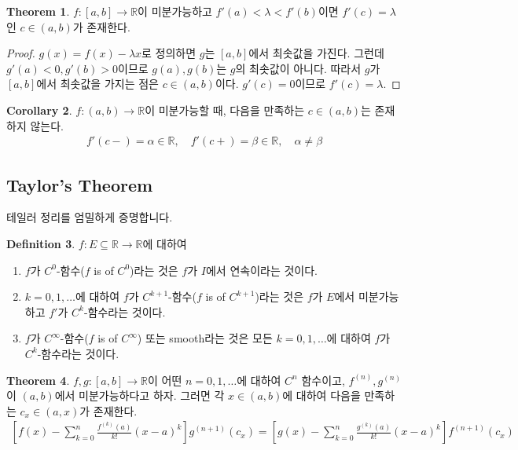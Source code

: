 \documentclass[12pt]{article}
\theoremstyle{definition}
\newtheorem{thm}{Theorem}[section]
\newtheorem{cor}[thm]{Corollary}
\newtheorem{defn}[thm]{Definition}
\def\RR{\mathbb{R}}
\begin{document}
\begin{thm}
	\(f: [a, b] \rightarrow \RR\)이 미분가능하고 \(f'(a) < \lambda < f'(b)\)이면 \(f'(c) = \lambda\)인 \(c \in (a, b)\)가 존재한다.
\end{thm}
\begin{proof}
	\(g(x) = f(x) - \lambda x\)로 정의하면 \(g\)는 \([a, b]\)에서 최솟값을 가진다. 그런데 \(g'(a) < 0, g'(b) > 0\)이므로 \(g(a), g(b)\)는 \(g\)의 최솟값이 아니다. 따라서 \(g\)가 \([a, b]\)에서 최솟값을 가지는 점은 \(c \in (a, b)\)이다. \(g'(c) = 0\)이므로 \(f'(c) = \lambda\).
\end{proof}

\begin{cor}
	\(f: (a, b) \rightarrow \RR\)이 미분가능할 때, 다음을 만족하는 \(c \in (a, b)\)는 존재하지 않는다.
	\begin{gather*}
		f'(c-) = \alpha \in \RR, \quad f'(c+) = \beta \in \RR, \quad \alpha \neq \beta
	\end{gather*}
\end{cor}

\subsection{Taylor's Theorem}

테일러 정리를 엄밀하게 증명합니다.

\begin{defn}
	\(f: E \subseteq \RR \rightarrow \RR\)에 대하여
	\begin{enumerate} [label=(\alph*), leftmargin=2\parindent]
		\item
		\(f\)가 \(C^0\)-함수(\(f\) is of \(C^0\))라는 것은 \(f\)가 \(I\)에서 연속이라는 것이다.
		\item
		\(k = 0, 1, \ldots\)에 대하여 \(f\)가 \(C^{k+1}\)-함수(\(f\) is of \(C^{k+1}\))라는 것은 \(f\)가 \(E\)에서 미분가능하고 \(f'\)가 \(C^k\)-함수라는 것이다.
		\item
		\(f\)가 \(C^\infty\)-함수(\(f\) is of \(C^\infty\)) 또는 smooth라는 것은 모든 \(k = 0, 1, \ldots\)에 대하여 \(f\)가 \(C^k\)-함수라는 것이다.
	\end{enumerate}
\end{defn}

\begin{thm} \label{thm taylor}
	\(f, g: [a, b] \rightarrow \RR\)이 어떤 \(n = 0, 1, \ldots\)에 대하여 \(C^n\) 함수이고, \(f^{(n)}, g^{(n)}\)이 \((a, b)\)에서 미분가능하다고 하자. 그러면 각 \(x \in (a, b)\)에 대하여 다음을 만족하는 \(c_x \in (a, x)\)가 존재한다.
	\begin{align*}
		\left[ f(x) - \sum_{k=0}^n \frac{f^{(k)}(a)}{k!} (x - a)^k \right] g^{(n+1)} (c_x) = \left[ g(x) - \sum_{k=0}^n \frac{g^{(k)}(a)}{k!} (x - a)^k \right] f^{(n+1)} (c_x)
	\end{align*}
\end{thm}
\end{document}
